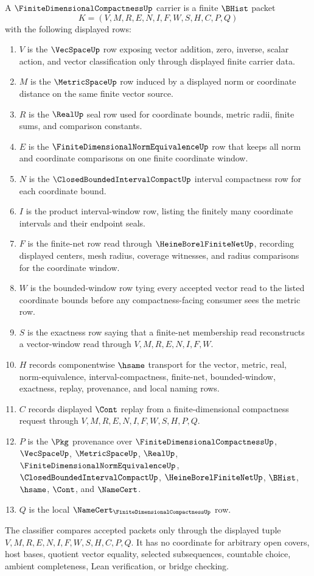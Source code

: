 \begin{definition}
\label{def:finite-dimensional-compactness-carrier}
A $\FiniteDimensionalCompactnessUp$ carrier is a finite $\BHist$ packet
$$
K=(V,M,R,E,N,I,F,W,S,H,C,P,Q)
$$
with the following displayed rows:
\begin{enumerate}
\item $V$ is the $\VecSpaceUp$ row exposing vector addition, zero, inverse, scalar action, and vector classification only through displayed finite carrier data.
\item $M$ is the $\MetricSpaceUp$ row induced by a displayed norm or coordinate distance on the same finite vector source.
\item $R$ is the $\RealUp$ seal row used for coordinate bounds, metric radii, finite sums, and comparison constants.
\item $E$ is the $\FiniteDimensionalNormEquivalenceUp$ row that keeps all norm and coordinate comparisons on one finite coordinate window.
\item $N$ is the $\ClosedBoundedIntervalCompactUp$ interval compactness row for each coordinate bound.
\item $I$ is the product interval-window row, listing the finitely many coordinate intervals and their endpoint seals.
\item $F$ is the finite-net row read through $\HeineBorelFiniteNetUp$, recording displayed centers, mesh radius, coverage witnesses, and radius comparisons for the coordinate window.
\item $W$ is the bounded-window row tying every accepted vector read to the listed coordinate bounds before any compactness-facing consumer sees the metric row.
\item $S$ is the exactness row saying that a finite-net membership read reconstructs a vector-window read through $V,M,R,E,N,I,F,W$.
\item $H$ records componentwise $\hsame$ transport for the vector, metric, real, norm-equivalence, interval-compactness, finite-net, bounded-window, exactness, replay, provenance, and local naming rows.
\item $C$ records displayed $\Cont$ replay from a finite-dimensional compactness request through $V,M,R,E,N,I,F,W,S,H,P,Q$.
\item $P$ is the $\Pkg$ provenance over $\FiniteDimensionalCompactnessUp$, $\VecSpaceUp$, $\MetricSpaceUp$, $\RealUp$, $\FiniteDimensionalNormEquivalenceUp$, $\ClosedBoundedIntervalCompactUp$, $\HeineBorelFiniteNetUp$, $\BHist$, $\hsame$, $\Cont$, and $\NameCert$.
\item $Q$ is the local $\NameCert_{\FiniteDimensionalCompactnessUp}$ row.
\end{enumerate}
The classifier compares accepted packets only through the displayed tuple $V,M,R,E,N,I,F,W,S,H,C,P,Q$. It has no coordinate for arbitrary open covers, host bases, quotient vector equality, selected subsequences, countable choice, ambient completeness, Lean verification, or bridge checking.
\end{definition}

